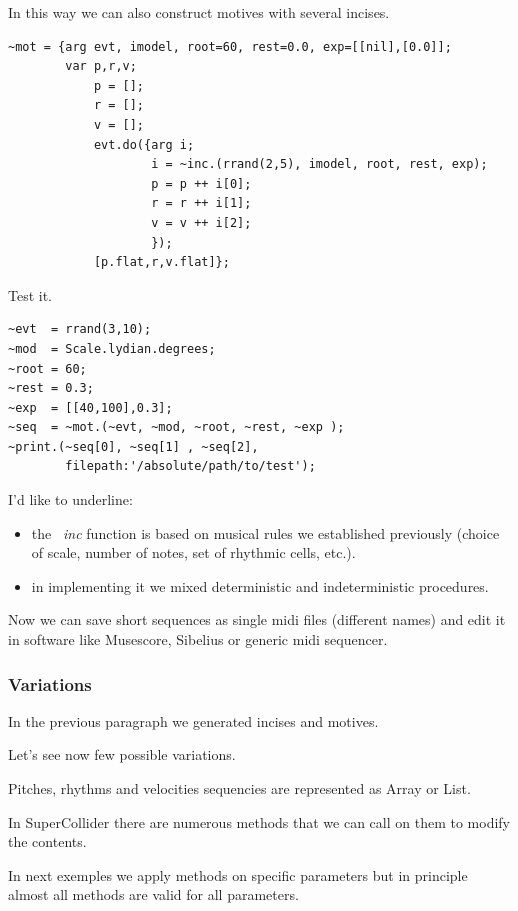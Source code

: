 In this way we can also construct motives with several incises.

\begin{lstlisting}[frame=single, caption=random motive function] 
~mot = {arg evt, imodel, root=60, rest=0.0, exp=[[nil],[0.0]];
        var p,r,v;
            p = [];
            r = [];
            v = [];
            evt.do({arg i;
                    i = ~inc.(rrand(2,5), imodel, root, rest, exp);
                    p = p ++ i[0];
                    r = r ++ i[1];
                    v = v ++ i[2]; 
                    });
            [p.flat,r,v.flat]};
\end{lstlisting}

Test it.

\begin{lstlisting}[frame=single] 
~evt  = rrand(3,10);
~mod  = Scale.lydian.degrees;
~root = 60;
~rest = 0.3;
~exp  = [[40,100],0.3];
~seq  = ~mot.(~evt, ~mod, ~root, ~rest, ~exp );
~print.(~seq[0], ~seq[1] , ~seq[2], 
        filepath:'/absolute/path/to/test');
\end{lstlisting}

I'd like to underline:
\begin{itemize}
\tightlist
\item the \textit{~inc} function is based on musical rules we established previously (choice of scale, number of notes, set of rhythmic cells, etc.).
\item in implementing it we mixed deterministic and indeterministic procedures.
\end{itemize}

Now we can save short sequences as single midi files (different names) and edit it in software like Musescore, Sibelius or generic midi sequencer.

\subsubsection{Variations}\label{variations}

In the previous paragraph we generated incises and motives.

Let's see now few possible variations.

Pitches, rhythms and velocities sequencies are represented as Array or List.

In SuperCollider there are numerous methods that we can call on them to modify the contents.

In next exemples we apply methods on specific parameters but in principle almost all methods are valid for all parameters. 

